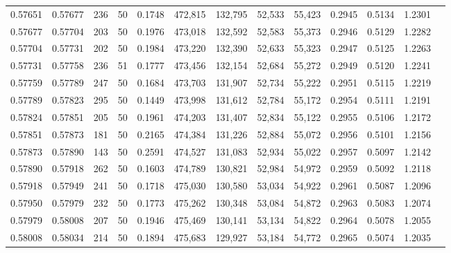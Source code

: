 \begin{tabular}{rrrrrrrrrrrrr}
0.57651 & 0.57677 &   236 &  50 &                                     0.1748 & 472,815 & 132,795 &  52,533 &  55,423 & 0.2945 & 0.5134 & 1.2301 \\
0.57677 & 0.57704 &   203 &  50 &                                     0.1976 & 473,018 & 132,592 &  52,583 &  55,373 & 0.2946 & 0.5129 & 1.2282 \\
0.57704 & 0.57731 &   202 &  50 &                                     0.1984 & 473,220 & 132,390 &  52,633 &  55,323 & 0.2947 & 0.5125 & 1.2263 \\
0.57731 & 0.57758 &   236 &  51 &                                     0.1777 & 473,456 & 132,154 &  52,684 &  55,272 & 0.2949 & 0.5120 & 1.2241 \\
0.57759 & 0.57789 &   247 &  50 &                                     0.1684 & 473,703 & 131,907 &  52,734 &  55,222 & 0.2951 & 0.5115 & 1.2219 \\
0.57789 & 0.57823 &   295 &  50 &                                     0.1449 & 473,998 & 131,612 &  52,784 &  55,172 & 0.2954 & 0.5111 & 1.2191 \\
0.57824 & 0.57851 &   205 &  50 &                                     0.1961 & 474,203 & 131,407 &  52,834 &  55,122 & 0.2955 & 0.5106 & 1.2172 \\
0.57851 & 0.57873 &   181 &  50 &                                     0.2165 & 474,384 & 131,226 &  52,884 &  55,072 & 0.2956 & 0.5101 & 1.2156 \\
0.57873 & 0.57890 &   143 &  50 &                                     0.2591 & 474,527 & 131,083 &  52,934 &  55,022 & 0.2957 & 0.5097 & 1.2142 \\
0.57890 & 0.57918 &   262 &  50 &                                     0.1603 & 474,789 & 130,821 &  52,984 &  54,972 & 0.2959 & 0.5092 & 1.2118 \\
0.57918 & 0.57949 &   241 &  50 &                                     0.1718 & 475,030 & 130,580 &  53,034 &  54,922 & 0.2961 & 0.5087 & 1.2096 \\
0.57950 & 0.57979 &   232 &  50 &                                     0.1773 & 475,262 & 130,348 &  53,084 &  54,872 & 0.2963 & 0.5083 & 1.2074 \\
0.57979 & 0.58008 &   207 &  50 &                                     0.1946 & 475,469 & 130,141 &  53,134 &  54,822 & 0.2964 & 0.5078 & 1.2055 \\
0.58008 & 0.58034 &   214 &  50 &                                     0.1894 & 475,683 & 129,927 &  53,184 &  54,772 & 0.2965 & 0.5074 & 1.2035 \\

\end{tabular}
